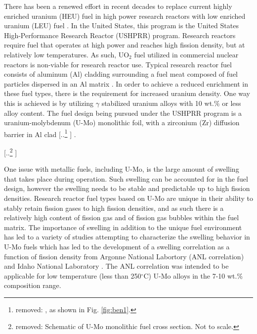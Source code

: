 \documentclass[review]{elsarticle}
\providecommand{\DIFaddtex}[1]{{\protect\color{blue} \sf #1}} %
\providecommand{\DIFdeltex}[1]{{\protect\color{red} [..\footnote{removed: #1} ]}} %
\providecommand{\DIFaddbegin}{} %
\providecommand{\DIFaddend}{} %
\providecommand{\DIFdelbegin}{} %
\providecommand{\DIFdelend}{} %
\providecommand{\DIFdelFL}[1]{\DIFdel{#1}} %
\providecommand{\DIFadd}[1]{\texorpdfstring{\DIFaddtex{#1}}{#1}} %
\providecommand{\DIFdel}[1]{\texorpdfstring{\DIFdeltex{#1}}{}} %
\newcommand{\DIFscaledelfig}{0.5}
\newlength{\DIFdelgraphicswidth} %
\newlength{\DIFdelgraphicsheight} %
\newcommand{\DIFaddincludegraphics}[2][]{{\color{blue}\fbox{\DIFOincludegraphics[#1]{#2}}}} %
\newcommand{\DIFdelincludegraphics}[2][]{%
\sbox{\DIFdelgraphicsbox}{\DIFOincludegraphics[#1]{#2}}%
\settoboxwidth{\DIFdelgraphicswidth}{\DIFdelgraphicsbox} %
\settoboxtotalheight{\DIFdelgraphicsheight}{\DIFdelgraphicsbox} %
\scalebox{\DIFscaledelfig}{%
\parbox[b]{\DIFdelgraphicswidth}{\usebox{\DIFdelgraphicsbox}\\[-\baselineskip] \rule{\DIFdelgraphicswidth}{0em}}\llap{\resizebox{\DIFdelgraphicswidth}{\DIFdelgraphicsheight}{%
\setlength{\unitlength}{\DIFdelgraphicswidth}%
\begin{picture}(1,1)%
\thicklines\linethickness{2pt} %
{\color[rgb]{1,0,0}\put(0,0){\framebox(1,1){}}}%
{\color[rgb]{1,0,0}\put(0,0){\line( 1,1){1}}}%
{\color[rgb]{1,0,0}\put(0,1){\line(1,-1){1}}}%
\end{picture}%
}\hspace*{3pt}}} %
} %
\DeclareRobustCommand{\DIFaddbegin}{\DIFOaddbegin \let\includegraphics\DIFaddincludegraphics} %
\DeclareRobustCommand{\DIFaddend}{\DIFOaddend \let\includegraphics\DIFOincludegraphics} %
\DeclareRobustCommand{\DIFdelbegin}{\DIFOdelbegin \let\includegraphics\DIFdelincludegraphics} %
\DeclareRobustCommand{\DIFdelend}{\DIFOaddend \let\includegraphics\DIFOincludegraphics} %
\begin{document}
There has been a renewed effort in recent decades to replace current highly enriched uranium (HEU) fuel in high power research reactors with low enriched uranium (LEU) fuel \cite{snelgrove1997}. In the United States, this program is the United States High-Performance Research Reactor (USHPRR) program. Research reactors require fuel that operates at high power and reaches high fission density, but at relatively low temperatures. As such, UO$_{2}$ fuel utilized in commercial nuclear reactors is non-viable for research reactor use. Typical research reactor fuel consists of aluminum (Al) cladding surrounding a fuel meat composed of fuel particles dispersed in an Al matrix \cite{meyer2014}. In order to achieve a reduced enrichment in these fuel types, there is the requirement for increased uranium density. One way this is achieved is by utilizing $\gamma$ stabilized uranium alloys with 10 wt.\% or less alloy content. The fuel design being pursued under the USHPRR program is a uranium-molybdenum (U-Mo) monolithic foil, with a zirconium (Zr) diffusion barrier in Al clad\DIFdelbegin \DIFdel{, as shown in Fig.
\ref{fig:ben1}. 
}\DIFdelend \DIFaddbegin \DIFadd{.
}\DIFaddend 

\DIFdelbegin %
{%
\DIFdelFL{Schematic of U-Mo monolithic fuel cross section. Not to scale.}}


\DIFdelend One issue with metallic fuels, including U-Mo, is the large amount of swelling that takes place during operation\cite{hofman1997}. Such swelling can be accounted for in the fuel design, however the swelling needs to be stable and predictable up to high fission densities. Research reactor fuel types based on U-Mo are unique in their ability to stably retain fission gases to high fission densities, and as such there is a relatively high content of fission gas and of fission gas bubbles within the fuel matrix. The importance of swelling in addition to the unique fuel environment has led to a variety of studies attempting to characterize the swelling behavior in U-Mo fuels \cite{rest2009, kim_anl08, meyer2002, kim2013} which has led to the development of a swelling correlation as a function of fission density from Argonne National Labortory (ANL correlation) \cite{kim2011} and Idaho National Laboratory \cite{umo_prelim_report2017}. The ANL correlation was intended to be applicable for low temperature (less than 250$^{\circ}$C) U-Mo alloys in the 7-10 wt.\% composition range. 
\end{document}
